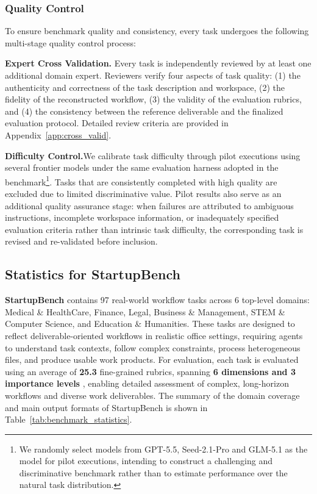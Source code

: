 \subsubsection{Quality Control}
To ensure benchmark quality and consistency, every task undergoes the following multi-stage quality control process:

\textbf{Expert Cross Validation.}
Every task is independently reviewed by at least one additional domain expert.
Reviewers verify four aspects of task quality:
(1) the authenticity and correctness of the task description and workspace,
(2) the fidelity of the reconstructed workflow,
(3) the validity of the evaluation rubrics, and
(4) the consistency between the reference deliverable and the finalized evaluation protocol.
Detailed review criteria are provided in Appendix~\ref{app:cross_valid}.





\textbf{Difficulty Control.}We calibrate task difficulty through pilot executions using several frontier models under the same evaluation harness adopted in the benchmark\footnote{We randomly select models from GPT-5.5, Seed-2.1-Pro and GLM-5.1 as the model for pilot executions, intending to construct a challenging and discriminative benchmark rather than to estimate performance over the natural task distribution.}. Tasks that are consistently completed with high quality are excluded due to limited discriminative value. Pilot results also serve as an additional quality assurance stage: when failures are attributed to ambiguous instructions, incomplete workspace information, or inadequately specified evaluation criteria rather than intrinsic task difficulty, the corresponding task is revised and re-validated before inclusion.


\subsection{Statistics for StartupBench}

\textbf{StartupBench} contains 97 real-world workflow tasks across 6 top-level domains: Medical \& HealthCare, Finance, Legal, Business \& Management, STEM \& Computer Science, and Education \& Humanities. These tasks are designed to reflect deliverable-oriented workflows in realistic office settings, requiring agents to understand task contexts, follow complex constraints, process heterogeneous files, and produce usable work products. For evaluation, each task is evaluated using an average of \textbf{25.3} fine-grained rubrics, spanning \textbf{6 dimensions and 3 importance levels} , enabling detailed assessment of complex, long-horizon workflows and diverse work deliverables. The  summary of the domain coverage and main output formats of StartupBench is shown in Table~\ref{tab:benchmark_statistics}.


